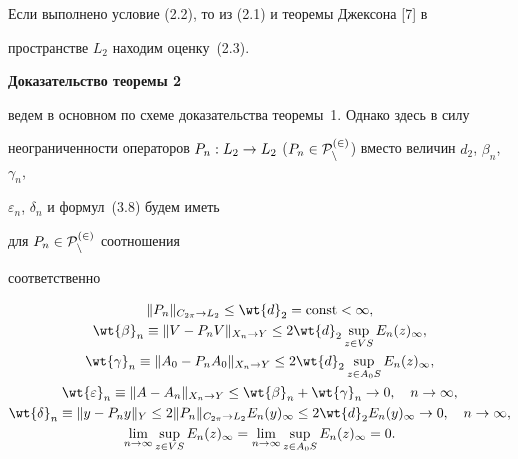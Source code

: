 Если выполнено условие (2.2), то из (2.1) и теоремы Джексона [7] в


пространстве $L_2$ находим оценку~(2.3).


\medskip





{\bf Доказательство теоремы 2 }


ведем в основном по схеме доказательства теоремы~1. Однако здесь в силу


неограниченности операторов $\operator{P_n}{L_2}{L_2}$ ($P_n\in


\rukopis{P}_n^{(2)}$) вместо величин $d_2$, $\beta_n$, $\gamma_n$,


$\varepsilon_n$, $\delta_n$ и формул~(3.8) будем иметь


для $P_n\in \cal P_n^{(2)}$ соотношения


соответственно


\begin{gather}


\|P_n\|_{{C_{2\pi}\rightarrow L_2}}


\leq \wt{d}_2=\const<\infty, \\


%


\wt{\beta}_n\equiv \|V-P_nV\|_{X_n\rightarrow Y} \leq 2 \wt{d}_2


\sup_{z\in VS} E_n(z)_{\infty}, \\


%


\wt{\gamma}_n\equiv \|A_0-P_nA_0\|_{X_n\rightarrow Y} \leq 2 \wt{d}_2


\sup_{z\in A_0S} E_n(z)_{\infty},\\


%


\wt{\varepsilon}_n\equiv \|A-A_n\|_{X_n\rightarrow Y} \leq \wt{\beta}_n+\wt{


\gamma}_n\rightarrow 0,\quad n\rightarrow \infty, \\


%


\wt{\delta}_n\equiv \|y-P_ny\|_{Y} \leq 2\|P_n\|_{


{C_{2\pi}\rightarrow L_2}} E_n(y)_{\infty}\leq


2 \wt{d}_2 E_n(y)_{\infty}\rightarrow 0,\quad n\rightarrow


\infty, \\


%


\lim_{n\rightarrow \infty}\sup_{z\in VS} E_n(z)_{\infty} =


\lim_{n\rightarrow \infty}\sup_{z\in A_0S} E_n(z)_{\infty} =0.


\end{gather}


